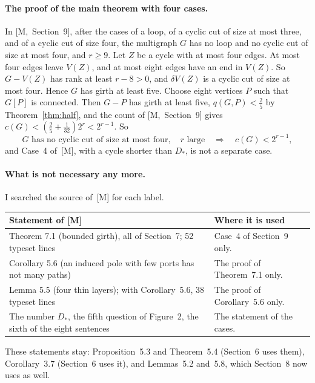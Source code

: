 \documentclass[11pt]{article}
\newcommand{\M}[1]{[M,~#1]}
\begin{document}
\paragraph{The proof of the main theorem with four cases.} In \M{Section~9}, after the cases of
a loop, of a cyclic cut of size at most three, and of a cyclic cut of size four, the multigraph
$G$ has no loop and no cyclic cut of size at most four, and $r\ge9$. Let $Z$ be a cycle with at
most four edges. At most four edges leave $V(Z)$, and at most eight edges have an end in $V(Z)$.
So $G-V(Z)$ has rank at least $r-8>0$, and $\delta V(Z)$ is a cyclic cut of size at most four.
Hence $G$ has girth at least five. Choose eight vertices $P$ such that $G[P]$ is connected.
Then $G-P$ has girth at least five, $q(G,P)<\frac25$ by Theorem~\ref{thm:half}, and the count
of \M{Section~9} gives $c(G)<(\frac25+\frac1{32})2^{r}<2^{r-1}$. So
\[
  G\text{ has no cyclic cut of size at most four},\quad r\text{ large}
  \quad\Longrightarrow\quad c(G)<2^{r-1},
\]
and Case~4 of~[M], with a cycle shorter than $D_*$, is not a separate case.

\paragraph{What is not necessary any more.} I searched the source of~[M] for each label.
\begin{center}
\small
\begin{tabular}{@{}p{5.4cm}p{8.8cm}@{}}
\toprule
Statement of [M] & Where it is used\\
\midrule
Theorem 7.1 (bounded girth), all of Section~7; 52 typeset lines & Case~4 of Section~9 only.\\\addlinespace
Corollary 5.6 (an induced pole with few ports has not many paths) & The proof of Theorem~7.1
only.\\\addlinespace
Lemma 5.5 (four thin layers); with Corollary~5.6, 38 typeset lines & The proof of Corollary~5.6
only.\\\addlinespace
The number $D_*$, the fifth question of Figure~2, the sixth of the eight sentences & The
statement of the cases.\\
\bottomrule
\end{tabular}
\end{center}
These statements stay: Proposition~5.3 and Theorem~5.4 (Section~6 uses them), Corollary~3.7
(Section~6 uses it), and Lemmas~5.2 and~5.8, which Section~8 now uses as well.
\end{document}
